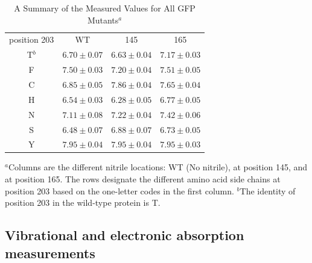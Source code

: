\begin{table}
    \caption[Experimental \pKa{} values of the GFP chromophore]{
        A Summary of the Measured \pKa{} Values for All GFP Mutants$^a$
    }
    \begin{center}
    \begin{tabular}{c|ccc}
        \toprule
        \rowcolor{lgray}
        position 203 & WT & \pCNF{} 145 & \pCNF{} 165 \\

        \cmidrule(r){1-1}\cmidrule(l){2-4}
        T$^b$ &   $ 6.70 \pm 0.07 $  &  $ 6.63 \pm 0.04 $ &  $ 7.17 \pm 0.03 $  \\
        F     &   $ 7.50 \pm 0.03 $  &  $ 7.20 \pm 0.04 $ &  $ 7.51 \pm 0.05 $  \\
        C     &   $ 6.85 \pm 0.05 $  &  $ 7.86 \pm 0.04 $ &  $ 7.65 \pm 0.04 $  \\
        H     &   $ 6.54 \pm 0.03 $  &  $ 6.28 \pm 0.05 $ &  $ 6.77 \pm 0.05 $  \\ 
        N     &   $ 7.11 \pm 0.08 $  &  $ 7.22 \pm 0.04 $ &  $ 7.42 \pm 0.06 $  \\ 
        S     &   $ 6.48 \pm 0.07 $  &  $ 6.88 \pm 0.07 $ &  $ 6.73 \pm 0.05 $  \\ 
        Y     &   $ 7.95 \pm 0.04 $  &  $ 7.95 \pm 0.04 $ &  $ 7.95 \pm 0.03 $  \\ 

        \bottomrule
    \end{tabular}
    \end{center}

    $^a$Columns are the different nitrile locations: WT (No nitrile), \pCNF{} at position 145, and \pCNF{} at position 165. The rows designate the different amino acid side chains at position 203 based on the one-letter codes in the first column. 
    $^b$The identity of position 203 in the wild-type protein is T.
    \label{tbl:pKas}
\end{table}

\subsection{Vibrational and electronic absorption measurements}

